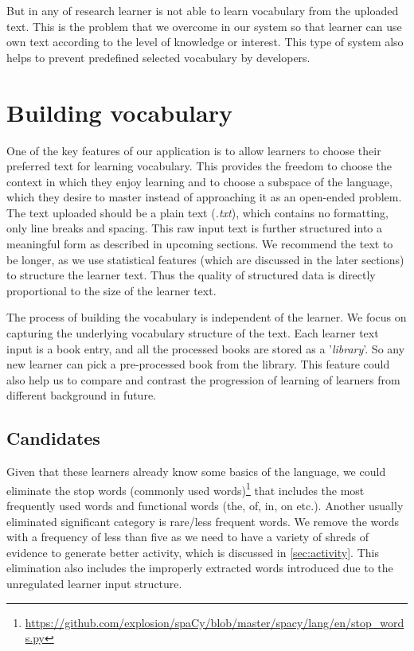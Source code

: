 \documentclass[11pt,a4paper]{article}
\begin{document}
But in any of research learner is not able to learn vocabulary from the uploaded text. This is the problem that we overcome in our system so that learner can use own text
according to the level of knowledge or interest. This type of system also helps to prevent predefined selected vocabulary by developers.  

\section{Building vocabulary}
One of the key features of our application is to allow learners to choose their preferred text for learning vocabulary. This provides the freedom to choose the context in which they enjoy learning and to choose a subspace of the language, which they desire to master instead of approaching it as an open-ended problem. The text uploaded should be a plain text (\textit{.txt}), which contains no formatting, only line breaks and spacing. This raw input text is further structured into a meaningful form as described in upcoming sections. We recommend the text to be longer, as we use statistical features (which are discussed in the later sections) to structure the learner text. Thus the quality of structured data is directly proportional to the size of the learner text.

The process of building the vocabulary is independent of the learner. We focus on capturing the underlying vocabulary structure of the text. Each learner text input is a book entry, and all the processed books are stored as a '\textit{library}'. So any new learner can pick a pre-processed book from the library. This feature could also help us to compare and contrast the progression of learning of learners from different background in future.

\subsection{Candidates}

Given that these learners already know some basics of the language, we could eliminate the stop words (commonly used words)\footnote{\url{https://github.com/explosion/spaCy/blob/master/spacy/lang/en/stop_words.py}} that includes the most frequently used words and functional words (the, of, in, on etc.). Another usually eliminated significant category is rare/less frequent words. We remove the words with a frequency of less than five as we need to have a variety of shreds of evidence to generate better activity, which is discussed in \autoref{sec:activity}. 
This elimination also includes the improperly extracted words introduced due to the unregulated learner input structure.
\end{document}
